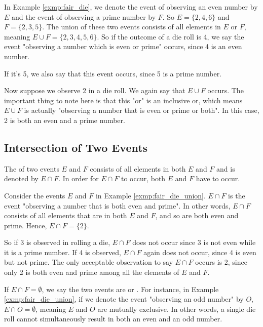 \begin{exmp}\label{exmp:fair_die_union}
	In Example \autoref{exmp:fair_die}, we denote the event of observing an even number by \( E \)
	and the event of observing a prime number by \( F \).
	So \( E = \{ 2, 4, 6 \} \) and \( F = \{ 2, 3, 5 \} \).
	The union of these two events consists of all elements in \( E \) or \( F \),
	meaning \( E \cup F = \{ 2, 3, 4, 5, 6 \} \).
	So if the outcome of a die roll is 4, we say the event "observing a number which is even or prime" occurs,
	since 4 is an even number.
	
	If it's 5, we also say that this event occurs, since 5 is a prime number.
	
	Now suppose we observe 2 in a die roll. We again say that \( E \cup F \) occurs.
	The important thing to note here is that this "or" is an inclusive or, which means \( E \cup F \)
	is actually "observing a number that is even or prime or both".
	In this case, 2 is both an even and a prime number.
\end{exmp}

\subsection{Intersection of Two Events}

The  of two events \( E \) and \( F \) consists of all elements in both \( E \) and \( F \) and is denoted by \( E \cap F \).
In order for \( E \cap F \) to occur, both \( E \) and \( F \) have to occur.

\begin{exmp}
	Consider the events \( E \) and \( F \) in Example \autoref{exmp:fair_die_union}.
	\( E \cap F \) is the event "observing a number that is both even and prime".
	In other words, \( E \cap F \) consists of all elements that are in both \( E \) and \( F \),
	and so are both even and prime.
	Hence, \( E \cap F = \{ 2 \} \).

	So if 3 is observed in rolling a die, \( E \cap F \) does not occur since 3 is not even while it is a prime number.
	If 4 is observed, \( E \cap F \) again does not occur, since 4 is even but not prime.
	The only acceptable observation to say \( E \cap F \) occurs is 2, since only 2 is both even and prime among all the elements of \( E \) and \( F \).
\end{exmp}

If \( E \cap F = \emptyset \), we say the two events are  or .
For instance, in Example \autoref{exmp:fair_die_union}, if we denote the event "observing an odd number" by \( O \),
\( E \cap O = \emptyset \), meaning \( E \) and \( O \) are mutually exclusive.
In other words, a single die roll cannot simultaneously result in both an even and an odd number.

